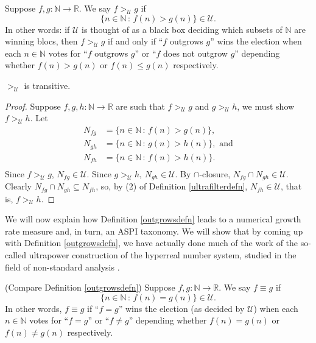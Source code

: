 \documentclass[twoside,11pt]{article}
\begin{document}
\begin{definition}
\label{outgrowsdefn}
    Suppose $f,g:\mathbb N\to\mathbb R$.
    We say $f>_\mathcal U g$ if
    \[\{n\in\mathbb N\,:\,f(n)>g(n)\}\in \mathcal U.\]
    In other words: if $\mathcal U$ is thought of as a black box deciding which
    subsets of $\mathbb N$ are winning blocs, then $f>_\mathcal U g$
    if and only if ``$f$ outgrows $g$'' wins the election when
    each $n\in\mathbb N$ votes for ``$f$ outgrows $g$'' or ``$f$ does not outgrow $g$''
    depending whether $f(n)>g(n)$ or $f(n)\leq g(n)$ respectively.
\end{definition}

\begin{lemma}
\label{transitivitylemma}
    $>_\mathcal U$ is transitive.
\end{lemma}

\begin{proof}
    Suppose $f,g,h:\mathbb N\to\mathbb R$
    are such that $f>_\mathcal U g$ and $g>_\mathcal U h$, we must show
    $f>_\mathcal U h$.
    Let
    \begin{align*}
        N_{fg} &= \{n\in\mathbb N\,:\,f(n)>g(n)\},\\
        N_{gh} &= \{n\in\mathbb N\,:\,g(n)>h(n)\},\mbox{ and}\\
        N_{fh} &= \{n\in\mathbb N\,:\,f(n)>h(n)\}.\\
    \end{align*}
    Since $f>_\mathcal U g$, $N_{fg}\in\mathcal U$.
    Since $g>_\mathcal U h$, $N_{gh}\in\mathcal U$.
    By $\cap$-closure, $N_{fg}\cap N_{gh}\in\mathcal U$.
    Clearly $N_{fg}\cap N_{gh}\subseteq N_{fh}$, so, by (2) of
    Definition \ref{ultrafilterdefn},
    $N_{fh}\in \mathcal U$, that is, $f>_\mathcal U h$.
\end{proof}

We will now explain how Definition \ref{outgrowsdefn} leads to a numerical
growth rate measure and, in turn, an ASPI taxonomy.
We will show that by coming up with Definition \ref{outgrowsdefn}, we have actually
done much of the work of the so-called ultrapower construction of
the hyperreal number system, studied in the field of non-standard
analysis \citep{robinson, goldblatt2012lectures}.

\begin{definition}
\label{equivrelndefn}
(Compare Definition \ref{outgrowsdefn})
    Suppose $f,g:\mathbb N\to\mathbb R$. We say
    $f\equiv g$ if
    \[
    \{n\in\mathbb N\,:\, f(n) = g(n)\} \in \mathcal U.
    \]
    In other words, $f\equiv g$ if ``$f=g$'' wins the election (as decided by
    $\mathcal U$) when each
    $n\in\mathbb N$ votes for ``$f=g$'' or ``$f\not=g$'' depending whether
    $f(n)=g(n)$ or $f(n)\neq g(n)$ respectively.
\end{definition}
\end{document}
